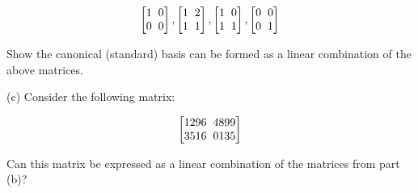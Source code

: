 \documentclass[11pt]{article}
\begin{document}
\begin{center}
\[ 
\begin{bmatrix}
   1  \hspace{2mm}    0  \\
    0   \hspace{2mm}  0 
            
\end{bmatrix}
,
\begin{bmatrix}
   1  \hspace{2mm}    2  \\
    1   \hspace{2mm}  1 
            
\end{bmatrix}
,
\begin{bmatrix}
   1 \hspace{2mm}    0  \\
    1   \hspace{2mm}  1
            
\end{bmatrix}
, 
\begin{bmatrix}
   0  \hspace{2mm}    0  \\
    0  \hspace{2mm}  1
            
\end{bmatrix}
\]
\end{center}

\vspace{1.5mm}

Show the canonical (standard) basis can be formed as a linear combination of the above matrices.


\vspace{4mm}

(c) Consider the following matrix:

\begin{center}
\[ 
\begin{bmatrix}
   1296 \hspace{2mm}    4899  \\
    3516   \hspace{2mm}  0135
            
\end{bmatrix}
\]
\end{center}

\vspace{1.5mm}

Can this matrix be expressed as a linear combination of the matrices from part (b)?
\end{document}

